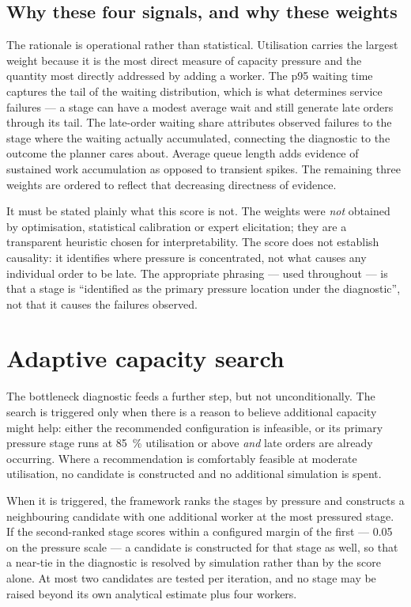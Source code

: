 \subsection{Why these four signals, and why these weights}

The rationale is operational rather than statistical. Utilisation carries the largest weight
because it is the most direct measure of capacity pressure and the quantity most directly
addressed by adding a worker. The p95 waiting time captures the tail of the waiting
distribution, which is what determines service failures --- a stage can have a modest average
wait and still generate late orders through its tail. The late-order waiting share attributes
observed failures to the stage where the waiting actually accumulated, connecting the diagnostic
to the outcome the planner cares about. Average queue length adds evidence of sustained work
accumulation as opposed to transient spikes. The remaining three weights are ordered to reflect
that decreasing directness of evidence.

It must be stated plainly what this score is not. The weights were \emph{not} obtained by
optimisation, statistical calibration or expert elicitation; they are a transparent heuristic
chosen for interpretability. The score does not establish causality: it identifies where
pressure is concentrated, not what causes any individual order to be late. The appropriate
phrasing --- used throughout  --- is that a stage is ``identified as the
primary pressure location under the diagnostic'', not that it causes the failures observed.

\section{Adaptive capacity search}
\label{sec:adaptive}

The bottleneck diagnostic feeds a further step, but not unconditionally. The search is triggered
only when there is a reason to believe additional capacity might help: either the recommended
configuration is infeasible, or its primary pressure stage runs at \SI{85}{\percent} utilisation
or above \emph{and} late orders are already occurring. Where a recommendation is comfortably
feasible at moderate utilisation, no candidate is constructed and no additional simulation is
spent.

When it is triggered, the framework ranks the stages by pressure and constructs a neighbouring
candidate with one additional worker at the most pressured stage. If the second-ranked stage scores within a configured margin of the
first --- \num{0.05} on the pressure scale --- a candidate is constructed for that stage as
well, so that a near-tie in the diagnostic is resolved by simulation rather than by the score
alone. At most two candidates are tested per iteration, and no stage may be raised beyond its
own analytical estimate plus four workers.

